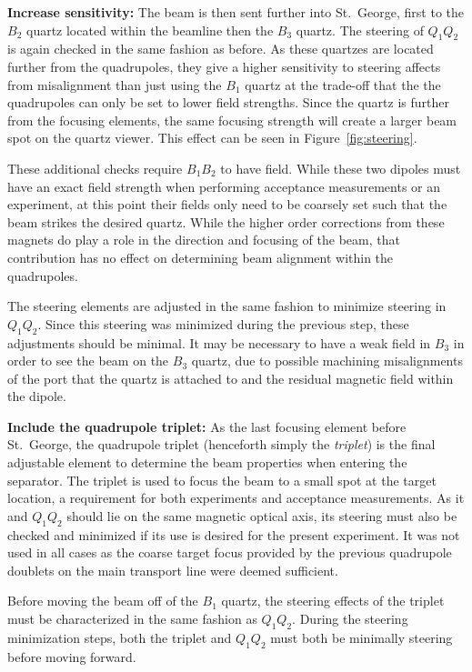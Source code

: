 \textbf{Increase sensitivity:}
The beam is then sent further into St.\ George, first to the $B_2$ quartz
located within the beamline then the $B_3$ quartz. The steering of $Q_1Q_2$ is
again checked in the same fashion as before. As these quartzes are located
further from the quadrupoles, they give a higher sensitivity to steering
affects from misalignment than just using the $B_1$ quartz at the trade-off
that the the quadrupoles can only be set to lower field strengths. Since the
quartz is further from the focusing elements, the same focusing strength will
create a larger beam spot on the quartz viewer. This effect can be seen in
Figure~\ref{fig:steering}.

These additional checks require $B_1B_2$ to have field. While these two dipoles
must have an exact field strength when performing acceptance measurements or an
experiment, at this point their fields only need to be coarsely set such that
the beam strikes the desired quartz. While the higher order corrections from
these magnets do play a role in the direction and focusing of the beam, that
contribution has no effect on determining beam alignment within the
quadrupoles.

The steering elements are adjusted in the same fashion to minimize steering in
$Q_1Q_2$. Since this steering was minimized during the previous step, these
adjustments should be minimal. It may
be necessary to have a weak field in $B_3$ in order to see the beam on the
$B_3$ quartz, due to possible machining misalignments of the port that the
quartz is attached to and the residual magnetic field within the dipole.

\textbf{Include the quadrupole triplet:}
As the last focusing element before St.\ George, the quadrupole triplet
(henceforth simply the \emph{triplet}) is the final adjustable element to
determine the beam properties when entering the separator. The triplet is used
to focus the beam to a small spot at the target location, a requirement for
both experiments and acceptance measurements. As it and $Q_1Q_2$ should lie on
the same magnetic optical axis, its steering must also be checked and minimized
if its use is desired for the present experiment. It was not used in all cases
as the coarse target focus provided by the previous quadrupole doublets on the
main transport line were deemed sufficient.

Before moving the beam off of the $B_1$ quartz, the steering effects of the
triplet must be characterized in the same fashion as $Q_1Q_2$. During the
steering minimization steps, both the triplet and $Q_1Q_2$ must both be
minimally steering before moving forward.

